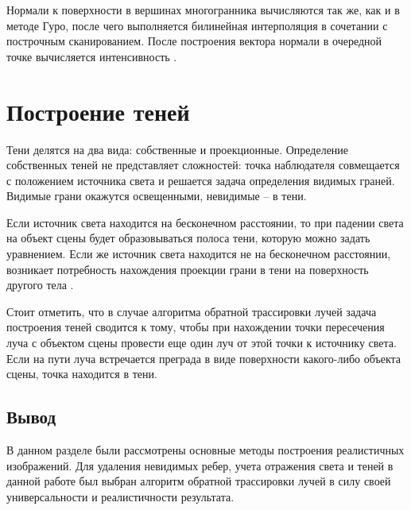 Нормали к поверхности в вершинах многогранника вычисляются так же, как и в методе Гуро, после чего выполняется билинейная интерполяция в сочетании с построчным сканированием. После построения вектора нормали в очередной точке вычисляется интенсивность \cite{lit5}.

\section{Построение теней}
Тени делятся на два вида: собственные и проекционные. Определение собственных теней не представляет сложностей: точка наблюдателя совмещается с положением источника света и решается задача определения видимых граней. Видимые грани окажутся освещенными, невидимые -- в тени.

Если источник света находится на бесконечном расстоянии, то при падении света на объект сцены будет образовываться полоса тени, которую можно задать уравнением. Если же источник света находится не на бесконечном расстоянии, возникает потребность нахождения проекции грани в тени на поверхность другого тела \cite{lit6}.

Стоит отметить, что в случае алгоритма обратной трассировки лучей задача построения теней сводится к тому, чтобы при нахождении точки пересечения луча с объектом сцены провести еще один луч от этой точки к источнику света. Если на пути луча встречается преграда в виде поверхности какого-либо объекта сцены, точка находится в тени.


\subsection*{Вывод}

В данном разделе были рассмотрены основные методы построения реалистичных изображений. Для удаления невидимых ребер, учета отражения света и теней в данной работе был выбран алгоритм обратной трассировки лучей в силу своей универсальности и реалистичности результата.

\clearpage
